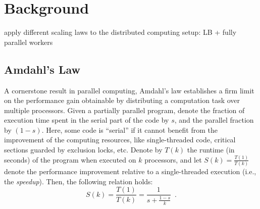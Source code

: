 \section{Background}\label{sec:background}

apply different scaling laws to the distributed computing setup: LB + fully parallel workers




\subsection{Amdahl's Law}
\label{sec:amdahl-law}

A cornerstone result in parallel computing, Amdahl's law \cite{10.1145/1465482.1465560} establishes a firm limit on the performance gain obtainable by distributing a computation task over multiple processors. Given a partially parallel program, denote the fraction of execution time spent %
in the serial part of the code by $s$, and the parallel fraction by $(1-s)$. Here, some code is ``serial'' if it cannot benefit from the improvement of the computing resources, like single-threaded code, critical sections guarded by exclusion locks, etc. Denote by $T(k)$ the runtime (in seconds) of the program when executed on $k$ processors, and let $S(k)=\frac{T(1)}{T(k)}$ denote the  performance improvement relative to a single-threaded execution (i.e., the \emph{speedup}). Then, the following relation holds:
\begin{equation}\label{eq:amdahl}
S(k) = \frac{T(1)}{T(k)} = \frac{1}{s + \frac{1-s}{k}} \enspace .
\end{equation}


